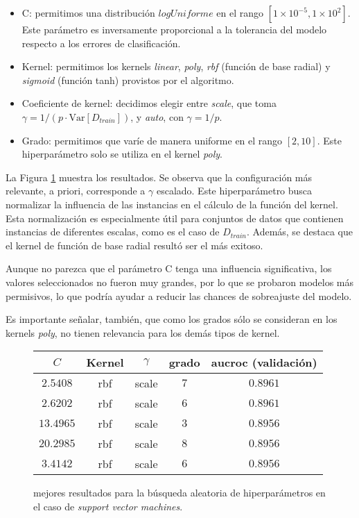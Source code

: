 \begin{itemize}
    \item C: permitimos una distribución $\textit{logUniforme}$ en el rango $[1\times10^{-5}, 1\times10^{2}]$. Este parámetro es inversamente proporcional a la tolerancia del modelo respecto a los errores de clasificación.
    \item Kernel: permitimos los kernels \textit{linear}, \textit{poly}, \textit{rbf} (función de base radial) y \textit{sigmoid} (función tanh) provistos por el algoritmo.
    \item Coeficiente de kernel: decidimos elegir entre \textit{scale}, que toma $\gamma = 1/(p\cdot\text{Var}[D_{train}])$, y \textit{auto}, con $\gamma = 1/p$.
    \item Grado: permitimos que varíe de manera uniforme en el rango $[2, 10]$. Este hiperparámetro solo se utiliza en el kernel \textit{poly}.
\end{itemize}

La Figura \ref{svm} muestra los resultados. Se observa que la configuración más relevante, a priori, corresponde a $\gamma$ escalado. Este hiperparámetro busca normalizar la influencia de las instancias en el cálculo de la función del kernel. Esta normalización es especialmente útil para conjuntos de datos que contienen instancias de diferentes escalas, como es el caso de $D_{train}$. Además, se destaca que el kernel de función de base radial resultó ser el más exitoso. 

Aunque no parezca que el parámetro C tenga una influencia significativa, los valores seleccionados no fueron muy grandes, por lo que se probaron modelos más permisivos, lo que podría ayudar a reducir las chances de sobreajuste del modelo. 

Es importante señalar, también, que como los grados sólo se consideran en los kernels \textit{poly}, no tienen relevancia para los demás tipos de kernel.

\vspace{0.5em}
\begin{figure}[!htbp]
    \begin{center}
        \begin{tabular}{ |c|c|c|c|c| } 
         \hline
        $C$ & Kernel & $\gamma$ & grado & aucroc (validación) \\
        \hline
        $2.5408$ & rbf     & scale & $7$ & $0.8961$ \\ 
        $2.6202$ & rbf    & scale & $6$ & $0.8961$ \\
        $13.4965$ & rbf   & scale & $3$ & $0.8956$ \\ 
        $20.2985$ & rbf   & scale & $8$ & $0.8956$ \\
        $3.4142$ & rbf    & scale & $6$ & $0.8956$ \\ 
        \hline
        \end{tabular}
    \end{center}
    \caption{mejores resultados para la búsqueda aleatoria de hiperparámetros en el caso de \textit{support vector machines}.} \label{svm}
\end{figure}

